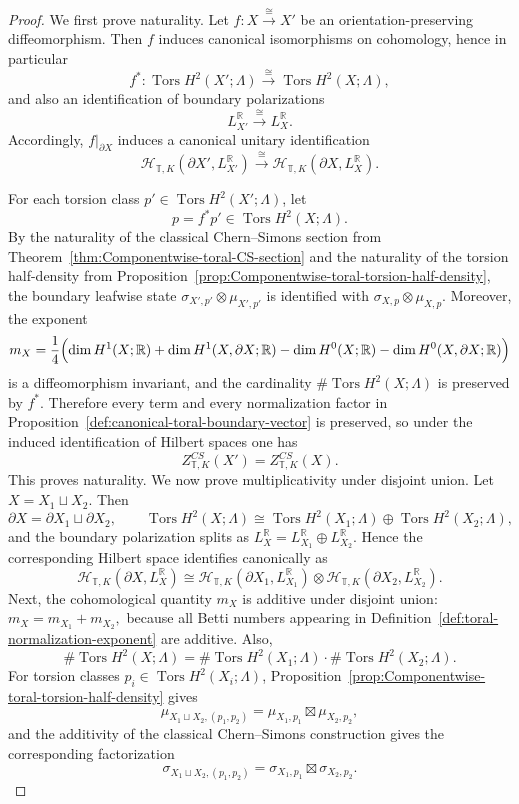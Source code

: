 \documentclass[12pt]{amsart}
\numberwithin{equation}{section}
\begin{document}
\begin{proof}
We first prove naturality. Let $f\colon X \xrightarrow{\ \cong\ } X'$ be an orientation-preserving diffeomorphism. Then $f$ induces canonical isomorphisms on cohomology,
hence in particular
\[
f^*\colon \operatorname{Tors} H^2(X';\Lambda)\xrightarrow{\ \cong\ }
\operatorname{Tors} H^2(X;\Lambda),
\]
and also an identification of boundary polarizations
\[
L_{X'}^{\mathbb R}\xrightarrow{\ \cong\ } L_X^{\mathbb R}.
\]
Accordingly, $f|_{\partial X}$ induces a canonical unitary identification
\[
\mathcal H_{\mathbb T,K}(\partial X',L_{X'}^{\mathbb R})
\xrightarrow{\ \cong\ }
\mathcal H_{\mathbb T,K}(\partial X,L_X^{\mathbb R}).
\]

For each torsion class $p' \in \operatorname{Tors} H^2(X';\Lambda)$, let
\[
p=f^*p'\in \operatorname{Tors} H^2(X;\Lambda).
\]
By the naturality of the classical Chern--Simons section from Theorem~\ref{thm:Componentwise-toral-CS-section} and the
naturality of the torsion half-density from Proposition~\ref{prop:Componentwise-toral-torsion-half-density}, the boundary
leafwise state $\sigma_{X',p'}\otimes \mu_{X',p'}$
is identified with $\sigma_{X,p}\otimes \mu_{X,p}.$ Moreover, the exponent
\[
m_X=\frac14\Bigl(
\dim H^1(X;\mathbb R)+\dim H^1(X,\partial X;\mathbb R)
-\dim H^0(X;\mathbb R)-\dim H^0(X,\partial X;\mathbb R)
\Bigr)
\]
is a diffeomorphism invariant, and the cardinality $\#\operatorname{Tors}H^2(X;\Lambda)$ is preserved by $f^*$. Therefore every term and every normalization factor in Proposition~\ref{def:canonical-toral-boundary-vector}
is preserved, so under the induced identification of Hilbert spaces one has
\[
Z^{CS}_{\mathbb T,K}(X')=Z^{CS}_{\mathbb T,K}(X).
\]
This proves naturality. We now prove multiplicativity under disjoint union. Let $X=X_1\sqcup X_2.$ Then
\[
\partial X=\partial X_1\sqcup \partial X_2,
\qquad
\operatorname{Tors}H^2(X;\Lambda)
\cong
\operatorname{Tors}H^2(X_1;\Lambda)\oplus \operatorname{Tors}H^2(X_2;\Lambda),
\]
and the boundary polarization splits as $L_X^{\mathbb R}=L_{X_1}^{\mathbb R}\oplus L_{X_2}^{\mathbb R}.$ Hence the corresponding Hilbert space identifies canonically as
\[
\mathcal H_{\mathbb T,K}(\partial X,L_X^{\mathbb R})
\cong
\mathcal H_{\mathbb T,K}(\partial X_1,L_{X_1}^{\mathbb R})
\otimes
\mathcal H_{\mathbb T,K}(\partial X_2,L_{X_2}^{\mathbb R}).
\]
Next, the cohomological quantity $m_X$ is additive under disjoint union: $m_X=m_{X_1}+m_{X_2},$ because all Betti numbers appearing in Definition~\ref{def:toral-normalization-exponent} are additive. Also,
\[
\#\operatorname{Tors}H^2(X;\Lambda)
=
\#\operatorname{Tors}H^2(X_1;\Lambda)\cdot
\#\operatorname{Tors}H^2(X_2;\Lambda).
\]
For torsion classes $p_i\in \operatorname{Tors}H^2(X_i;\Lambda)$, Proposition~\ref{prop:Componentwise-toral-torsion-half-density}
gives
\[
\mu_{X_1\sqcup X_2,(p_1,p_2)}
=
\mu_{X_1,p_1}\boxtimes \mu_{X_2,p_2},
\]
and the additivity of the classical Chern--Simons construction gives the corresponding factorization
\[
\sigma_{X_1\sqcup X_2,(p_1,p_2)}
=
\sigma_{X_1,p_1}\boxtimes \sigma_{X_2,p_2}.
\]


\end{proof}
\end{document}
